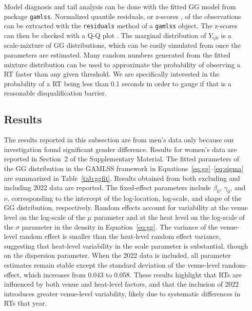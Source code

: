 \documentclass[12pt, letterpaper]{article}
\begin{document}
Model diagnosis and tail analysis can be done with the fitted GG model
from package \texttt{gamlss}. Normalized quantile residuals, or
z-scores \citep{dunn1996randomized}, of the observations can be
extracted with the \texttt{residuals} method of a \texttt{gamlss}
object. The z-scores can then be checked with a Q-Q plot
\citep{almeida2018ggplot2}. The marginal
distribution of $Y_{ijk}$ is a scale-mixture of GG distributions, which can be
easily simulated from once the parameters are estimated. Many
random numbers generated from the fitted mixture distribution can be used to
approximate the probability of observing a RT faster than any given
threshold. We are specifically interested in the probability of a RT
being less than 0.1 seconds in order to gauge if that is a reasonable
disqualification barrier.



\subsection{Results}
\label{sec:results_barrier}

The results reported in this subsection are from men's data only
because our investigation found significant gender difference.
Results for women's data are reported in Section~2 of the
Supplementary Material. The fitted parameters of the GG distribution in the
GAMLSS framework in Equations~\eqref{eq:gg}--\eqref{eq:sigma} are
summarized in Table~\ref{tab:ggfit}. Results obtained from both
excluding and including 2022 data are reported. The fixed-effect
parameters include $\beta_0$, $\gamma_0$, and $\nu$, corresponding to
the intercept of the log-location, log-scale, and shape of the GG
distribution, respectively. Random effects account for variability at
the venue level on the log-scale of the $\mu$ parameter
and at the heat level on the log-scale of the $\sigma$
parameter in the density in Equation~\eqref{eq:gg}. The variance
of the venue-level random effect is smaller than the heat-level random
effect variance, suggesting that heat-level variability in the scale
parameter is substantial, though on the dispersion parameter. When the
2022 data is included, all parameter estimates remain stable except
the standard deviation of the venue-level random-effect,
which increases from 0.043 to 0.058. These results
highlight that RTs are influenced by both venue and heat-level
factors, and that the inclusion of 2022 introduces greater venue-level
variability, likely due to systematic differences in RTs that year.
\end{document}

